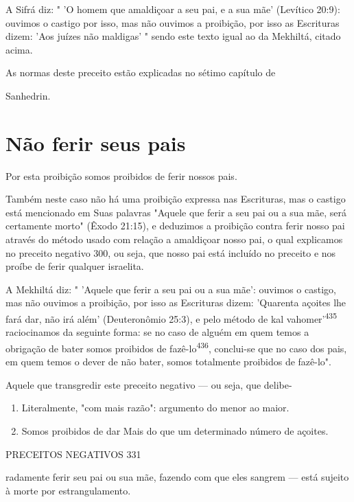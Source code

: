 \begin{itemize}
\begin{enumrate}
\begin{itemize}
\begin{itemize}
\begin{itemize}
A Sifrá diz: " 'O homem que amaldiçoar a seu pai, e a sua mãe'
(Leví­tico 20:9): ouvimos o castigo por isso, mas não ouvimos a
proibição, por isso as Escrituras dizem: 'Aos juízes não maldigas' "
sendo este texto igual ao da Mekhiltá, citado acima.


As normas deste preceito estão explicadas no sétimo capítulo de


Sanhedrin.

\section{Não ferir seus pais}


Por esta proibição somos proibidos de ferir nossos pais.


Também neste caso não há uma proibição expressa nas Escrituras, mas o
castigo está mencionado em Suas palavras "Aquele que ferir a seu pai ou
a sua mãe, será certamente morto" (Êxodo 21:15), e deduzimos a proibição
contra ferir nosso pai através do método usado com relação a amaldiçoar
nos­so pai, o qual explicamos no preceito negativo 300, ou seja, que
nosso pai está incluído no preceito e nos proíbe de ferir qualquer
israelita.

A Mekhiltá diz: " 'Aquele que ferir a seu pai ou a sua mãe': ouvimos o
castigo, mas não ouvimos a proibição, por isso as Escrituras dizem:
'Quaren­ta açoites lhe fará dar, não irá além' (Deuteronômio 25:3), e
pelo método de kal vahomer'\textsuperscript{435} raciocinamos da
seguinte forma: se no caso de alguém em quem temos a obrigação de bater
somos proibidos de fazê-lo\textsuperscript{436}, conclui-se que no caso
dos pais, em quem temos o dever de não bater, somos totalmente
proi­bidos de fazê-lo".


Aquele que transgredir este preceito negativo --- ou seja, que delibe-

\begin{enumerate}
\def\labelenumi{\arabic{enumi}.}
\setcounter{enumi}{434}
\item
 
 Literalmente, "com mais razão": argumento do menor ao maior.
 
\item
 
 Somos proibidos de dar Mais do que um determinado número de açoites.
 
\end{enumerate}


PRECEITOS NEGATIVOS 331

radamente ferir seu pai ou sua mãe, fazendo com que eles sangrem ---
está su­jeito à morte por estrangulamento.



\end{itemize}
\end{itemize}
\end{itemize}
\end{enumrate}
\end{itemize}
